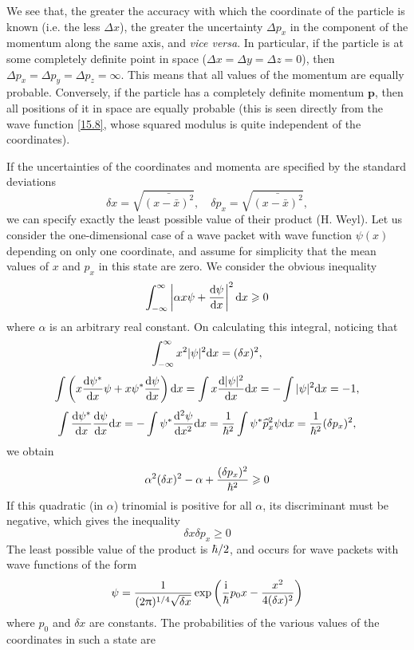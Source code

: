 We see that, the greater the accuracy with which the coordinate of the particle is known (i.e. the less $ \Delta x $), the greater the uncertainty $ \Delta p_x $ in the component of the momentum along the same axis, and \textit{vice versa}. In particular, if the particle is at some completely definite point in space ($ \Delta x = \Delta y = \Delta z = 0 $), then $ \Delta p_x =\Delta p_y = \Delta p_z =\infty $. This means that all values of the momentum are equally probable. Conversely, if the particle has a completely definite momentum $ \bm{p} $, then all positions of it in space are equally probable (this is seen directly from the wave function \eqref{15.8}, whose squared modulus is quite independent of the coordinates).

If the uncertainties of the coordinates and momenta are specified by the standard deviations
\[ \delta x=\sqrt{\bar{(x-\bar{x})^2}},\quad\delta p_x =\sqrt{\bar{(x-\bar{x})^2}},\]
we can specify exactly the least possible value of their product (H. Weyl). Let us consider the one-dimensional case of a wave packet with wave function $ \psi(x) $ depending on only one coordinate, and assume for simplicity that the mean values of $ x $ and $ p_x $ in this state are zero. We consider the obvious inequality
\[ \int_{-\infty}^{\infty}\left\vert\alpha x\psi+\frac{\mathrm{d}\psi}{\mathrm{d} x}\right\vert^2\mathrm{d} x\geqslant0 \]
where $ \alpha $ is an arbitrary real constant. On calculating this integral, noticing that
\[ \int_{-\infty}^{\infty}x^2|\psi|^2\mathrm{d} x=(\delta x)^2, \]
\[ \int\left(x\frac{\mathrm{d} \psi^*}{\mathrm{d} x}\psi+x\psi^*\frac{\mathrm{d}\psi}{\mathrm{d} x} \right)\mathrm{d} x=\int x\frac{\mathrm{d} |\psi|^2}{\mathrm{d} x}\mathrm{d} x=-\int|\psi|^2\mathrm{d} x=-1, \]
\[ \int\frac{\mathrm{d}\psi^*}{\mathrm{d} x}\frac{\mathrm{d} \psi}{\mathrm{d} x}\mathrm{d} x=-\int\psi^*\frac{\mathrm{d}^2\psi}{\mathrm{d} x^2}\mathrm{d} x=\frac{1}{\hbar^2}\int\psi^*\widehat{p}_x^2\psi\mathrm{d} x=\frac{1}{\hbar^2}(\delta p_x)^2, \]
we obtain
\[ \alpha^2(\delta x)^2-\alpha+\frac{(\delta p_x)^2}{\hbar^2}\geqslant0 \]
If this quadratic (in $ \alpha $) trinomial is positive for all $ \alpha $, its discriminant must be negative, which gives the inequality
\begin{equation}\label{16.7}
\delta x\delta p_x\geqslant0
\end{equation}
The least possible value of the product is $ \hbar/2 $, and occurs for wave packets with wave functions of the form
\begin{equation}\label{16.8}
\psi=\frac{1}{(2\uppi)^{1/4}\sqrt{\delta x}}\exp\left(\frac{\mathrm{i}}{\hbar}p_0x-\frac{x^2}{4(\delta x)^2} \right)
\end{equation}
where $ p_0 $ and $ \delta x $ are constants. The probabilities of the various values of the coordinates in such a state are
